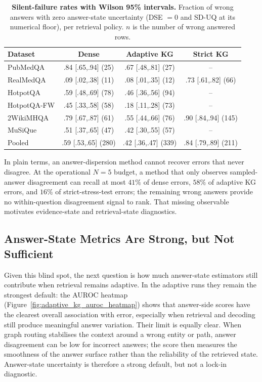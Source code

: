 \begin{table}[t]
\centering
\footnotesize
\caption{%
  \textbf{Silent-failure rates with Wilson 95\% intervals.}
  Fraction of wrong answers with zero answer-state uncertainty
  (DSE $=0$ and SD-UQ at its numerical floor), per retrieval policy.
  $n$ is the number of wrong answered rows.%
}
\label{tab:silent_failures}
\setlength{\tabcolsep}{2.5pt}
\begin{tabular}{@{}lccc@{}}
\toprule
Dataset & Dense & Adaptive KG & Strict KG \\
\midrule
PubMedQA    & .84 [.65,.94] (25) & .67 [.48,.81] (27) & --        \\
RealMedQA   & .09 [.02,.38] (11) & .08 [.01,.35] (12) & .73 [.61,.82] (66) \\
HotpotQA    & .59 [.48,.69] (78) & .46 [.36,.56] (94) & --        \\
HotpotQA-FW & .45 [.33,.58] (58) & .18 [.11,.28] (73) & --        \\
2WikiMHQA   & .79 [.67,.87] (61) & .55 [.44,.66] (76) & .90 [.84,.94] (145)\\
MuSiQue     & .51 [.37,.65] (47) & .42 [.30,.55] (57) & --        \\
\midrule
Pooled      & .59 [.53,.65] (280) & .42 [.36,.47] (339) & .84 [.79,.89] (211) \\
\bottomrule
\end{tabular}
\end{table}

In plain terms, an answer-dispersion method cannot recover errors that never
disagree.
At the operational $N{=}5$ budget, a method that only observes sampled-answer
disagreement can recall at most $41\%$ of dense errors, $58\%$ of adaptive
KG errors, and $16\%$ of strict-stress-test errors; the remaining wrong
answers provide no within-question disagreement signal to rank.
That missing observable motivates evidence-state and retrieval-state
diagnostics.

\subsection{Answer-State Metrics Are Strong, but Not Sufficient}
\label{sec:results_output}

Given this blind spot, the next question is how much answer-state estimators
still contribute when retrieval remains adaptive.
In the adaptive runs they remain the strongest default: the AUROC heatmap
(Figure~\ref{fig:adaptive_kg_auroc_heatmap}) shows that answer-side scores have
the clearest overall association with error, especially when retrieval and
decoding still produce meaningful answer variation.
Their limit is equally clear.
When graph routing stabilises the context around a wrong entity or path, answer
disagreement can be low for incorrect answers; the score then measures the
smoothness of the answer surface rather than the reliability of the retrieved
state.
Answer-state uncertainty is therefore a strong default, but not a lock-in
diagnostic.

